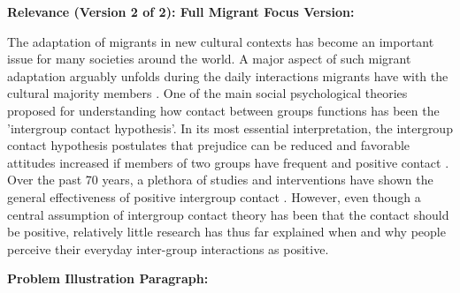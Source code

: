 \documentclass[man, 12pt, a4paper]{apa7}
\theoremstyle{break}
\theoremstyle{plain}
\begin{document}
\textbf{Relevance (Version 2 of 2): Full Migrant Focus Version:}

The adaptation of migrants in new cultural contexts has become an important issue for many societies around the world. A major aspect of such migrant adaptation arguably unfolds during the daily interactions migrants have with the cultural majority members \citep{Maxwell2017, Sam2010}. One of the main social psychological theories proposed for understanding how contact between groups functions has been the ’intergroup contact hypothesis’. In its most essential interpretation, the intergroup contact hypothesis postulates that prejudice can be reduced and favorable attitudes increased if members of two groups have frequent and positive contact \citep[e.g.,][]{Allport1954b, Hewstone1996, Pettigrew1998}. Over the past 70 years, a plethora of studies and interventions have shown the general effectiveness of positive intergroup contact \citep[e.g.,][]{Pettigrew2006}. However, even though a central assumption of intergroup contact theory has been that the contact should be positive, relatively little research has thus far explained when and why people perceive their everyday inter-group interactions as positive.


\textbf{Problem Illustration Paragraph:}
\end{document}
